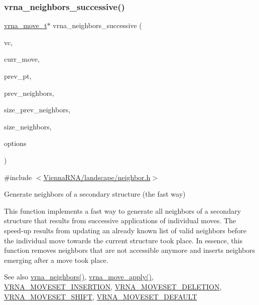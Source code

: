 \subsubsection{\texorpdfstring{vrna\_neighbors\_successive()}{vrna\_neighbors\_successive()}}
{\footnotesize\ttfamily \mbox{\hyperlink{group__neighbors_ga08630e00206cd163ea29c462bf5f4755}{vrna\+\_\+move\+\_\+t}}$\ast$ vrna\+\_\+neighbors\+\_\+successive (\begin{DoxyParamCaption}\item[{const \mbox{\hyperlink{group__fold__compound_ga1b0cef17fd40466cef5968eaeeff6166}{vrna\+\_\+fold\+\_\+compound\+\_\+t}} $\ast$}]{vc,  }\item[{const \mbox{\hyperlink{group__neighbors_ga08630e00206cd163ea29c462bf5f4755}{vrna\+\_\+move\+\_\+t}} $\ast$}]{curr\+\_\+move,  }\item[{const short $\ast$}]{prev\+\_\+pt,  }\item[{const \mbox{\hyperlink{group__neighbors_ga08630e00206cd163ea29c462bf5f4755}{vrna\+\_\+move\+\_\+t}} $\ast$}]{prev\+\_\+neighbors,  }\item[{int}]{size\+\_\+prev\+\_\+neighbors,  }\item[{int $\ast$}]{size\+\_\+neighbors,  }\item[{unsigned int}]{options }\end{DoxyParamCaption})}



{\ttfamily \#include $<$\mbox{\hyperlink{landscape_2neighbor_8h}{Vienna\+R\+N\+A/landscape/neighbor.\+h}}$>$}



Generate neighbors of a secondary structure (the fast way) 

This function implements a fast way to generate all neighbors of a secondary structure that results from successive applications of individual moves. The speed-\/up results from updating an already known list of valid neighbors before the individual move towards the current structure took place. In essence, this function removes neighbors that are not accessible anymore and inserts neighbors emerging after a move took place.

\begin{DoxySeeAlso}{See also}
\mbox{\hyperlink{group__neighbors_ga4f8eefae08c05f5a49a4d4ee5d02e32f}{vrna\+\_\+neighbors()}}, \mbox{\hyperlink{group__neighbors_gacdbc5f609b46aeb07d2c7e015677a1e0}{vrna\+\_\+move\+\_\+apply()}}, \mbox{\hyperlink{group__neighbors_gaf39028db9c70d3be528929182a3f2d5a}{V\+R\+N\+A\+\_\+\+M\+O\+V\+E\+S\+E\+T\+\_\+\+I\+N\+S\+E\+R\+T\+I\+ON}}, \mbox{\hyperlink{group__neighbors_gac05db9392c6647e3e9a6982096c5b384}{V\+R\+N\+A\+\_\+\+M\+O\+V\+E\+S\+E\+T\+\_\+\+D\+E\+L\+E\+T\+I\+ON}}, \mbox{\hyperlink{group__neighbors_ga68ea27c81de4b74e48b775c04052590b}{V\+R\+N\+A\+\_\+\+M\+O\+V\+E\+S\+E\+T\+\_\+\+S\+H\+I\+FT}}, \mbox{\hyperlink{group__neighbors_gaa5ffec4dd0d02df320f123e6888154d1}{V\+R\+N\+A\+\_\+\+M\+O\+V\+E\+S\+E\+T\+\_\+\+D\+E\+F\+A\+U\+LT}}
\end{DoxySeeAlso}

